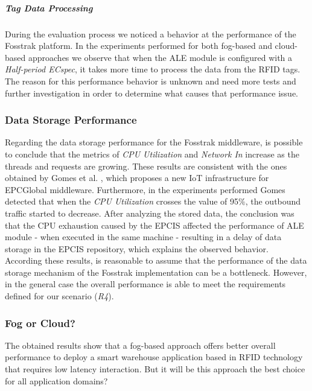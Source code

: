 \subparagraph{Tag Data Processing}
\label{subp:eval_tag_processing}
During the evaluation process we noticed a behavior at the performance of the Fosstrak platform.
In the experiments performed for both fog-based and cloud-based approaches we observe that when
the \gls{ALE} module is configured with a \textit{Half-period ECspec}, it takes more time to
process the data from the \gls{RFID} tags. The reason for this performance behavior is unknown and
need more tests and further investigation in order to determine what causes that performance issue.

\subsubsection{Data Storage Performance}
\label{subs:eval_results_data}
Regarding the data storage performance for the Fosstrak middleware, is possible to conclude that the metrics
of \textit{CPU Utilization} and \textit{Network In} increase as the threads and requests are growing.
These results are consistent with the ones obtained by Gomes et al. \cite{gomes2014future}, which
proposes a new \gls{IoT} infrastructure for \gls{EPC}Global middleware. Furthermore, in the experiments
performed Gomes detected that when the \textit{CPU Utilization} crosses the value of 95$\%$, the
outbound traffic started to decrease. After analyzing the stored data, the conclusion was that the
\gls{CPU} exhaustion caused by the \gls{EPCIS} affected the performance of \gls{ALE} module - when
executed in the same machine - resulting in a delay of data storage in the \gls{EPCIS} repository,
which explains the observed behavior.\\

According these results, is reasonable to assume that the performance of the data storage mechanism of
the Fosstrak implementation can be a bottleneck. However, in the general case the overall performance
is able to meet the requirements defined for our scenario (\textit{R4}).

\subsubsection{Fog or Cloud?}
\label{subs:eval_conclusion}
The obtained results show that a fog-based approach offers better overall performance to deploy a
smart warehouse application based in \gls{RFID} technology that requires low latency interaction.
But it will be this approach the best choice for all application domains?\\

